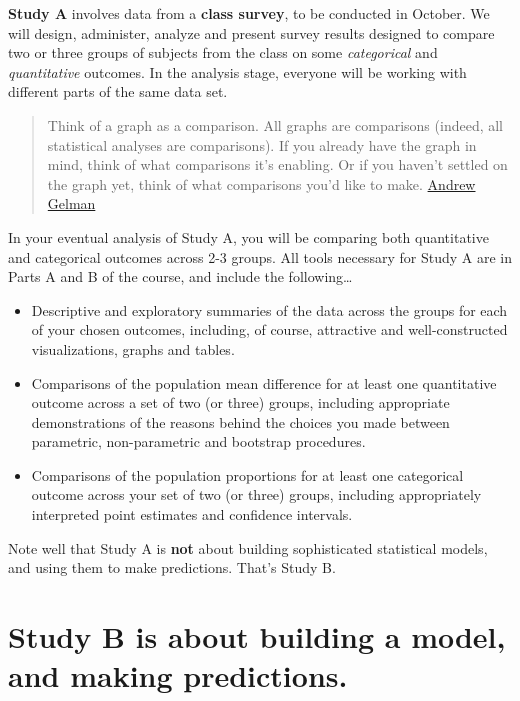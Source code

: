 \documentclass[]{book}
\providecommand{\tightlist}{%
  \setlength{\itemsep}{0pt}\setlength{\parskip}{0pt}}
\begin{document}
\textbf{Study A} involves data from a \textbf{class survey}, to be conducted in October. We will design, administer, analyze and present survey results designed to compare two or three groups of subjects from the class on some \emph{categorical} and \emph{quantitative} outcomes. In the analysis stage, everyone will be working with different parts of the same data set.

\begin{quote}
Think of a graph as a comparison. All graphs are comparisons (indeed, all statistical analyses are comparisons). If you already have the graph in mind, think of what comparisons it's enabling. Or if you haven't settled on the graph yet, think of what comparisons you'd like to make. \href{http://andrewgelman.com/2014/03/25/statistical-graphics-course-statistical-graphics-advice/}{Andrew Gelman}
\end{quote}

In your eventual analysis of Study A, you will be comparing both quantitative and categorical outcomes across 2-3 groups. All tools necessary for Study A are in Parts A and B of the course, and include the following\ldots{}

\begin{itemize}
\tightlist
\item
  Descriptive and exploratory summaries of the data across the groups for each of your chosen outcomes, including, of course, attractive and well-constructed visualizations, graphs and tables.
\item
  Comparisons of the population mean difference for at least one quantitative outcome across a set of two (or three) groups, including appropriate demonstrations of the reasons behind the choices you made between parametric, non-parametric and bootstrap procedures.
\item
  Comparisons of the population proportions for at least one categorical outcome across your set of two (or three) groups, including appropriately interpreted point estimates and confidence intervals.
\end{itemize}

Note well that Study A is \textbf{not} about building sophisticated statistical models, and using them to make predictions. That's Study B.

\hypertarget{study-b-is-about-building-a-model-and-making-predictions.}{%
\section{Study B is about building a model, and making predictions.}\label{study-b-is-about-building-a-model-and-making-predictions.}}
\end{document}
